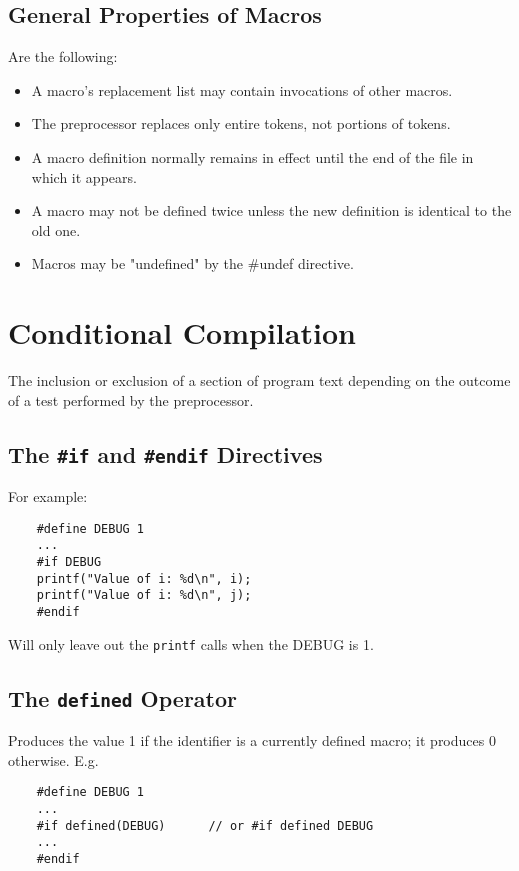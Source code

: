 \documentclass[openany]{book}
\begin{document}
    \subsection*{General Properties of Macros}

    Are the following:
    \begin{itemize}
        \item A macro's replacement list may contain invocations of other macros.
        \item The preprocessor replaces only entire tokens, not portions of tokens.
        \item A macro definition normally remains in effect until the end of the file in which it appears.
        \item A macro may not be defined twice unless the new definition is identical to the old one.
        \item Macros may be "undefined" by the \#undef directive.
    \end{itemize}

    \section{Conditional Compilation}

    The inclusion or exclusion of a section of program text depending on the outcome of a test performed by the preprocessor.

    \subsection*{The \texttt{\#if} and \texttt{\#endif} Directives}

    For example:
    \begin{lstlisting}
    #define DEBUG 1
    ...
    #if DEBUG
    printf("Value of i: %d\n", i);
    printf("Value of i: %d\n", j);
    #endif
    \end{lstlisting}

    Will only leave out the \texttt{printf} calls when the DEBUG is 1. 

    \subsection*{The \texttt{defined} Operator}

    Produces the value 1 if the identifier is a currently defined macro; it produces 0 otherwise. E.g.
    \begin{lstlisting}
    #define DEBUG 1
    ...
    #if defined(DEBUG)      // or #if defined DEBUG
    ...
    #endif
    \end{lstlisting}
     
\end{document}
